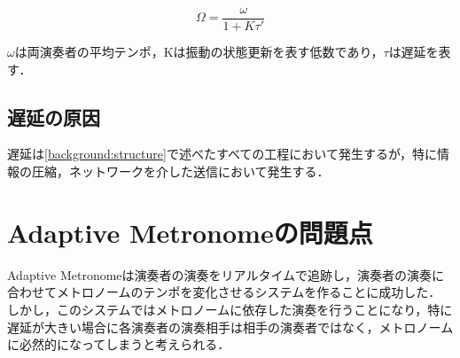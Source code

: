 \begin{displaymath}
  \Omega = \frac{\omega }{1 + K\tau '}
\end{displaymath}

\begin{math}\omega \end{math}は両演奏者の平均テンポ，Kは振動の状態更新を表す低数であり，\begin{math}\tau \end{math}は遅延を表す．

\subsection{遅延の原因}
遅延は\ref{background:structure}で述べたすべての工程において発生するが，特に情報の圧縮，ネットワークを介した送信において発生する．

\section{Adaptive Metronomeの問題点}
\label{related:admet}
Adaptive Metronomeは演奏者の演奏をリアルタイムで追跡し，演奏者の演奏に合わせてメトロノームのテンポを変化させるシステムを作ることに成功した．
しかし，このシステムではメトロノームに依存した演奏を行うことになり，特に遅延が大きい場合に各演奏者の演奏相手は相手の演奏者ではなく，メトロノームに必然的になってしまうと考えられる．


